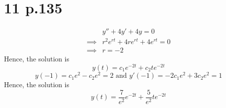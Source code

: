 \documentclass[11pt]{article}
\begin{document}
\section*{11 p.135}
\begin{equation*}
    \begin{aligned}
        &y'' + 4y' + 4y = 0 \\
        \implies &r^2 e^{rt} + 4re^{rt} + 4e^{rt} = 0 \\
        \implies &r = -2
    \end{aligned}
\end{equation*}
Hence, the solution is 
\[
    y(t) = c_1 e^{-2t} + c_2 te^{-2t}    
\]
\[
    y(-1) = c_1 e^2 - c_2e^2  = 2 \text{ and } y'(-1) = -2c_1e^2 + 3c_2e^2 = 1
\]
Hence, the solution is 
\[
    y(t) = \frac{7}{e^2}e^{-2t} + \frac{5}{e^2}te^{-2t}
\]
\end{document}
